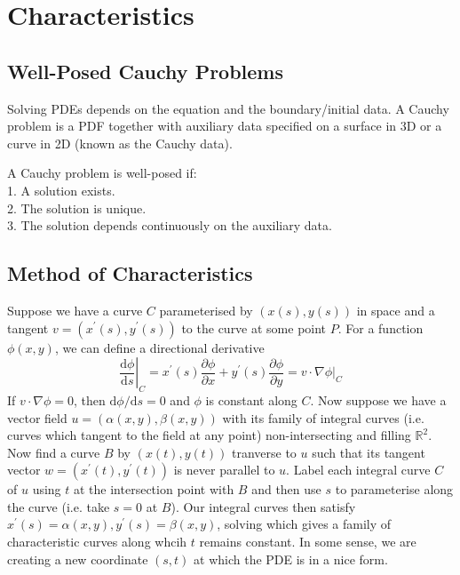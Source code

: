 \section{Characteristics}
\subsection{Well-Posed Cauchy Problems}
Solving PDEs depends on the equation and the boundary/initial data.
A Cauchy problem is a PDF together with auxiliary data specified on a surface in 3D or a curve in 2D (known as the Cauchy data).
\begin{definition}
    A Cauchy problem is well-posed if:\\
    1. A solution exists.\\
    2. The solution is unique.\\
    3. The solution depends continuously on the auxiliary data.
\end{definition}
\subsection{Method of Characteristics}
Suppose we have a curve $C$ parameterised by $(x(s),y(s))$ in space and a tangent $v=(x^\prime(s),y^\prime(s))$ to the curve at some point $P$.
For a function $\phi(x,y)$, we can define a directional derivative
$$\left.\frac{\mathrm d\phi}{\mathrm ds}\right|_C=x^\prime(s)\frac{\partial\phi}{\partial x}+y^\prime(s)\frac{\partial\phi}{\partial y}=v\cdot \nabla\phi|_C$$
If $v\cdot\nabla\phi=0$, then $\mathrm d\phi/\mathrm ds=0$ and $\phi$ is constant along $C$.
Now suppose we have a vector field $u=(\alpha(x,y),\beta(x,y))$ with its family of integral curves (i.e. curves which tangent to the field at any point) non-intersecting and filling $\mathbb R^2$.
Now find a curve $B$ by $(x(t),y(t))$ tranverse to $u$ such that its tangent vector $w=(x^\prime(t),y^\prime(t))$ is never parallel to $u$.
Label each integral curve $C$ of $u$ using $t$ at the intersection point with $B$ and then use $s$ to parameterise along the curve (i.e. take $s=0$ at $B$).
Our integral curves then satisfy $x^\prime(s)=\alpha(x,y),y^\prime(s)=\beta(x,y)$, solving which gives a family of characteristic curves along whcih $t$ remains constant.
In some sense, we are creating a new coordinate $(s,t)$ at which the PDE is in a nice form.
